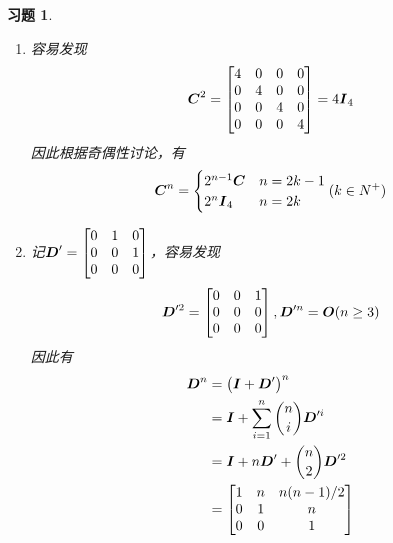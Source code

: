 \documentclass{ctexart}
\newtheorem{problem}{习题}[section]
\begin{document}
\begin{problem}\

\begin{enumerate}

    \item[(3)]
        {
        容易发现
        \begin{equation*}
            \boldsymbol{C}^2=
            \begin{bmatrix}
                4 & 0 & 0 & 0 \\
                0 & 4 & 0 & 0 \\
                0 & 0 & 4 & 0 \\
                0 & 0 & 0 & 4
            \end{bmatrix}=4\boldsymbol{I}_4
        \end{equation*}
        因此根据奇偶性讨论，有
        \begin{equation*}
            \boldsymbol{C}^n=
            \begin{cases}
                2^{n-1}\boldsymbol{C} & n=2k-1 \\
                2^n\boldsymbol{I}_4   & n=2k
            \end{cases}
            (k\in N^+)
        \end{equation*}
        }

    \item[(4)]
        {
        记\(\boldsymbol{D}'=\begin{bmatrix}0&1&0\\0&0&1\\0&0&0\end{bmatrix}\)，容易发现
        \begin{equation*}
            \boldsymbol{D}'^2=\begin{bmatrix}0&0&1\\0&0&0\\0&0&0\end{bmatrix},\boldsymbol{D}'^n=\boldsymbol{O}(n\ge3)
        \end{equation*}
        因此有
        \begin{align*}
            \boldsymbol{D}^n & =\left( \boldsymbol{I}+\boldsymbol{D}' \right)^n                 \\
                    & =\boldsymbol{I}+\sum_{i=1}^n\binom{n}{i}\boldsymbol{D}'^i \\
                    & =\boldsymbol{I}+n\boldsymbol{D}'+\binom{n}{2}\boldsymbol{D}'^2     \\
                    & =\begin{bmatrix}
                1 & n & n(n-1)/2 \\
                0 & 1 & n        \\
                0 & 0 & 1
            \end{bmatrix}
        \end{align*}
        }
\end{enumerate}
\end{problem}
\end{document}
